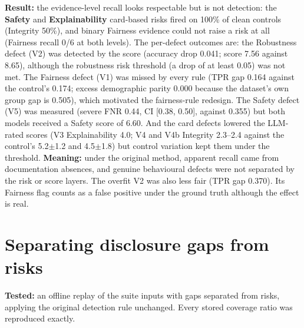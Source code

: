\textbf{Result:} the evidence-level recall looks respectable but is not detection: the \textbf{Safety} and \textbf{Explainability} card-based risks fired on 100\% of clean controls (Integrity 50\%), and binary Fairness evidence could not raise a risk at all (Fairness recall 0/6 at both levels). The per-defect outcomes are: the Robustness defect (V2) was detected by the score (accuracy drop 0.041; score 7.56 against 8.65), although the robustness risk threshold (a drop of at least 0.05) was not met. The Fairness defect (V1) was missed by every rule (TPR gap 0.164 against the control's 0.174; excess demographic parity 0.000 because the dataset's own group gap is 0.505), which motivated the fairness-rule redesign. The Safety defect (V5) was measured (severe FNR 0.44, CI [0.38, 0.50], against 0.355) but both models received a Safety score of 6.60. And the card defects lowered the LLM-rated scores (V3 Explainability 4.0; V4 and V4b Integrity 2.3--2.4 against the control's 5.2$\pm$1.2 and 4.5$\pm$1.8) but control variation kept them under the threshold. \textbf{Meaning:} under the original method, apparent recall came from documentation absences, and genuine behavioural defects were not separated by the risk or score layers. The overfit V2 was also less fair (TPR gap 0.370). Its Fairness flag counts as a false positive under the ground truth although the effect is real.

\section{Separating disclosure gaps from risks}\label{sec:gapres}
\textbf{Tested:} an offline replay of the suite inputs with gaps separated from risks, applying the original detection rule unchanged. Every stored coverage ratio was reproduced exactly.

